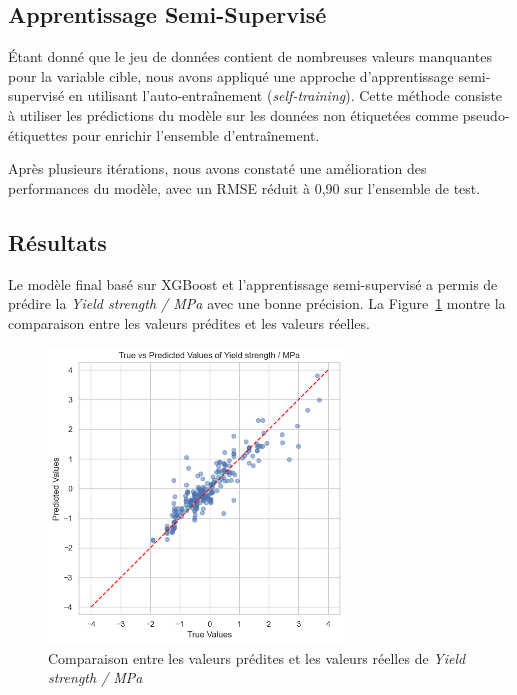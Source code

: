 \documentclass{article}
\begin{document}
\subsection{Apprentissage Semi-Supervisé}

Étant donné que le jeu de données contient de nombreuses valeurs manquantes pour la variable cible, nous avons appliqué une approche d'apprentissage semi-supervisé en utilisant l'auto-entraînement (\textit{self-training}). Cette méthode consiste à utiliser les prédictions du modèle sur les données non étiquetées comme pseudo-étiquettes pour enrichir l'ensemble d'entraînement.

Après plusieurs itérations, nous avons constaté une amélioration des performances du modèle, avec un RMSE réduit à 0,90 sur l'ensemble de test.

\subsection{Résultats}

Le modèle final basé sur XGBoost et l'apprentissage semi-supervisé a permis de prédire la \textit{Yield strength / MPa} avec une bonne précision. La Figure~\ref{fig:predictions_vs_true} montre la comparaison entre les valeurs prédites et les valeurs réelles.

\begin{figure}[H]
    \centering
    \includegraphics[width=0.7\textwidth]{images/predictions_vs_true.png}
    \caption{Comparaison entre les valeurs prédites et les valeurs réelles de \textit{Yield strength / MPa}}
    \label{fig:predictions_vs_true}
\end{figure}
\end{document}
